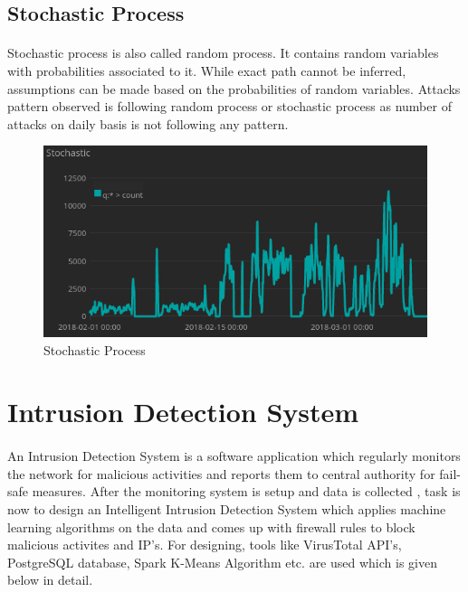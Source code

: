 \documentclass{report}
\begin{document}
\subsection{Stochastic Process}
\paragraph{}
Stochastic process is also called random process. It contains random variables with probabilities associated to it. While exact path cannot be inferred, assumptions can be made based on the probabilities of random variables. Attacks pattern observed is following random process or stochastic process as number of attacks on daily basis is not following any pattern.

\begin{figure}[H]
\centering
\caption{Stochastic Process}
\includegraphics[scale=0.7]{Stochastic_Process}
\end{figure}

\section{Intrusion Detection System}
\paragraph{}
An Intrusion Detection System is a software application which regularly monitors the network for malicious activities and reports them to central authority for fail-safe measures. After the monitoring system is setup and data is collected , task is now to design an Intelligent Intrusion Detection System which applies machine learning algorithms on the data and comes up with firewall rules to block malicious activites and IP's. For designing, tools like VirusTotal API's, PostgreSQL database, Spark K-Means Algorithm etc. are used which is given below in detail.
\end{document}
